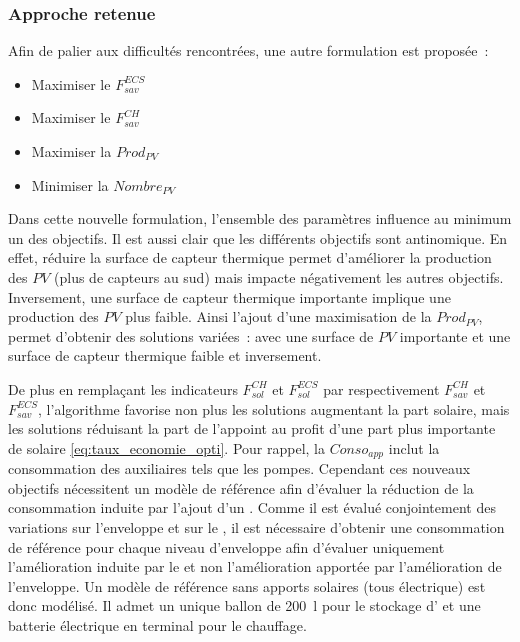 \subsubsection{Approche retenue} %
\label{ssub:approche_retenue}
\noindent Afin de palier aux difficultés rencontrées, une autre formulation est proposée~:
\begin{itemize}
  \item Maximiser le $F_{sav}^{ECS}$
  \item Maximiser le $F_{sav}^{CH}$
  \item Maximiser la $Prod_{PV}$
  \item Minimiser la $Nombre_{PV}$
\end{itemize}

Dans cette nouvelle formulation, l’ensemble des paramètres influence au minimum un des
objectifs. Il est aussi clair que les différents objectifs sont antinomique.
En effet, réduire la surface de capteur thermique permet d’améliorer la production des
$PV$ (plus de capteurs au sud) mais impacte négativement les autres objectifs.
Inversement, une surface de capteur thermique importante implique une production des $PV$
plus faible. Ainsi l’ajout d’une maximisation de la $Prod_{PV}$, permet d’obtenir des
solutions variées~: avec une surface de $PV$ importante et une surface de capteur
thermique faible et inversement.

De plus en remplaçant les indicateurs $F_{sol}^{CH}$ et $F_{sol}^{ECS}$ par respectivement
$F_{sav}^{CH}$ et $F_{sav}^{ECS}$, l’algorithme favorise non plus les solutions augmentant
la part solaire, mais les solutions réduisant la part de l’appoint au profit d’une part
plus importante de solaire \eqref{eq:taux_economie_opti}. Pour rappel, la $Conso_{app}$
inclut la consommation des auxiliaires tels que les pompes. Cependant ces nouveaux
objectifs nécessitent un modèle de référence afin d’évaluer la réduction de la
consommation induite par l’ajout d’un . Comme il est évalué conjointement des
variations sur l’enveloppe et sur le , il est nécessaire d’obtenir une
consommation de référence pour chaque niveau d’enveloppe afin d’évaluer uniquement
l’amélioration induite par le  et non l’amélioration apportée par l’amélioration
de l’enveloppe. Un modèle de référence sans apports solaires (tous électrique) est donc
modélisé. Il admet un unique ballon de \SI{200}{\litre} pour le stockage d’ et
une batterie électrique en terminal pour le chauffage.

